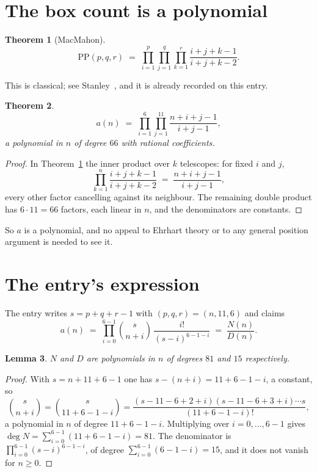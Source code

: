 \documentclass[11pt,a4paper]{article}
\theoremstyle{plain}
\newtheorem{theorem}{Theorem}
\newtheorem{lemma}[theorem]{Lemma}
\theoremstyle{definition}
\begin{document}
\section{The box count is a polynomial}

\begin{theorem}[MacMahon]\label{thm:mm}
\[
\mathrm{PP}(p,q,r)\;=\;\prod_{i=1}^{p}\prod_{j=1}^{q}\prod_{k=1}^{r}
\frac{i+j+k-1}{i+j+k-2} .
\]
\end{theorem}

This is classical; see Stanley~\cite{stanley}, and it is already recorded on this entry.

\begin{theorem}\label{thm:poly}
\[
a(n)\;=\;\prod_{i=1}^{6}\prod_{j=1}^{11}\frac{n+i+j-1}{i+j-1},
\]
a polynomial in $n$ of degree $66$ with rational coefficients.
\end{theorem}

\begin{proof}
In Theorem~\ref{thm:mm} the inner product over $k$ telescopes: for fixed $i$ and $j$,
\[
\prod_{k=1}^{n}\frac{i+j+k-1}{i+j+k-2}\;=\;\frac{n+i+j-1}{i+j-1} ,
\]
every other factor cancelling against its neighbour. The remaining double product has
$6\cdot11=66$ factors, each linear in $n$, and the denominators are constants.
\end{proof}

So $a$ is a polynomial, and no appeal to Ehrhart theory or to any general position argument is
needed to see it.

\section{The entry's expression}

The entry writes $s=p+q+r-1$ with $(p,q,r)=(n,11,6)$ and claims
\[
a(n)\;=\;\prod_{i=0}^{6-1}\binom{s}{n+i}\,\frac{i!}{(s-i)^{6-1-i}}\;=\;
\frac{N(n)}{D(n)} .
\]

\begin{lemma}\label{lem:deg}
$N$ and $D$ are polynomials in $n$ of degrees $81$ and $15$ respectively.
\end{lemma}

\begin{proof}
With $s=n+11+6-1$ one has $s-(n+i)=11+6-1-i$, a constant, so
\[
\binom{s}{n+i}=\binom{s}{11+6-1-i}
=\frac{(s-11-6+2+i)(s-11-6+3+i)\cdots s}{(11+6-1-i)!},
\]
a polynomial in $n$ of degree $11+6-1-i$. Multiplying over $i=0,\dots,6-1$ gives
$\deg N=\sum_{i=0}^{6-1}(11+6-1-i)=81$. The denominator is
$\prod_{i=0}^{6-1}(s-i)^{6-1-i}$, of degree
$\sum_{i=0}^{6-1}(6-1-i)=15$, and it does not vanish for $n\ge0$.
\end{proof}
\end{document}

